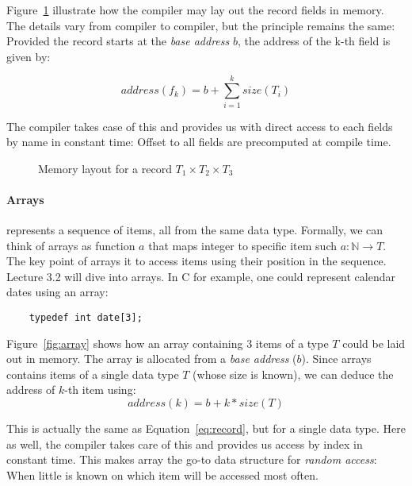 \documentclass{aldast}
\begin{document}
  Figure~\ref{fig:record} illustrate how the compiler may lay out the
  record fields in memory. The details vary from compiler to compiler,
  but the principle remains the same: Provided the record starts at
  the \emph{base address} $b$, the address of the k-th field is given
  by:

  \begin{equation}
    address(f_k) = b + \sum_{i=1}^{k} size(T_i) \label{eq:record}
  \end{equation}

  The compiler takes case of this and provides us with direct access
  to each fields by name in constant time: Offset to all fields are
  precomputed at compile time.
  
  \begin{figure}[htbp]
    \begin{center}
      
    \end{center}
    \caption{Memory layout for a record $T_1 \times T_2 \times T_3$}
    \label{fig:record}
  \end{figure}

  
\paragraph{Arrays} represents a sequence of items, all from the same data
  type. Formally, we can think of arrays as function $a$ that maps
  integer to specific item such $a: \mathbb{N} \to T$. The key point
  of arrays it to access items using their position in the
  sequence. Lecture 3.2 will dive into arrays. In C for example,
  one could represent calendar dates using an array:
  \begin{verbatim}
    typedef int date[3];
  \end{verbatim}
  
  Figure~\ref{fig:array} shows how an array containing 3 items of a
  type $T$ could be laid out in memory. The array is allocated from a
  \emph{base address} ($b$). Since arrays contains items of a single
  data type $T$ (whose size is known), we can deduce the address of
  $k$-th item using:
  \begin{equation}
    address(k) = b + k * size(T) \label{eq:array}
  \end{equation}
  
  This is actually the same as Equation~\ref{eq:record}, but for a
  single data type. Here as well, the compiler takes care of this and
  provides us access by index in constant time. This makes array the
  go-to data structure for \emph{random access}: When little is known
  on which item will be accessed most often.
  
\end{document}
